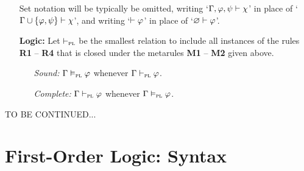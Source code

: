 \documentclass[a4paper, 11pt]{article} %
\begin{document}
\begin{enumerate}[leftmargin=1.2in,labelsep=.15in]
    Set notation will be typically be omitted, writing `$\Gamma, \varphi, \psi \vdash \chi$' in place of `$\Gamma\cup\lbrace\varphi,\psi\rbrace \vdash \chi$', and writing `$\vdash \varphi$' in place of `$\varnothing \vdash\varphi$'.
    \item[\bf Logic:] Let $\vdash_{\textsc{pl}}$ be the smallest relation to include all instances of the rules \textbf{R1} -- \textbf{R4} that is closed under the metarules \textbf{M1} -- \textbf{M2} given above. 
      \begin{itemize}
        \item[\it Sound:] $\Gamma \vDash_{\textsc{pl}} \varphi$ whenever $\Gamma \vdash_{\textsc{pl}} \varphi$.
        \item[\it Complete:] $\Gamma \vdash_{\textsc{pl}} \varphi$ whenever $\Gamma \vDash_{\textsc{pl}} \varphi$.
      \end{itemize}
\end{enumerate}






\noindent
TO BE CONTINUED...
\pagebreak

\section*{\sc First-Order Logic: Syntax}
\end{document}
